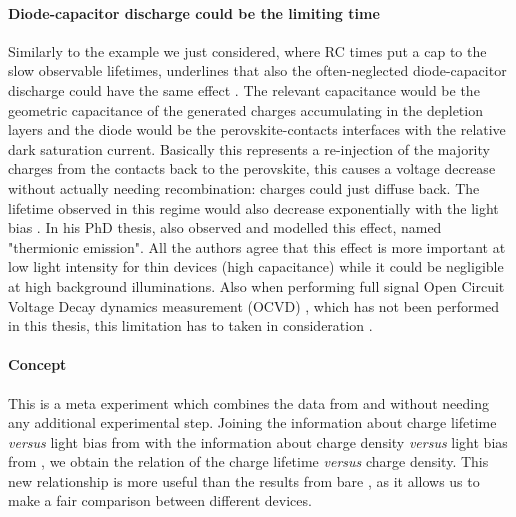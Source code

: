 		\paragraph{Diode\hyp{}capacitor discharge could be the limiting time}
		Similarly to the example we just considered, where RC times put a cap to the slow observable lifetimes,  underlines that also the often-neglected diode\hyp{}capacitor discharge could have the same effect \cite{Tvingstedt2017,Hellen2003}.
		The relevant capacitance would be the geometric capacitance of the generated charges accumulating in the depletion layers and the diode would be the perovskite-contacts interfaces with the relative dark saturation current.
		Basically this represents a re\hyp{}injection of the majority charges from the contacts back to the perovskite, this causes a voltage decrease without actually needing recombination: charges could just diffuse back.
		The lifetime observed in this regime would also decrease exponentially with the light bias \cite{Castaner1981}.
		In his PhD thesis, also  observed and modelled this effect, named "thermionic emission".
		All the authors agree that this effect is more important at low light intensity for thin devices (high capacitance) \cite{Kiermasch2018} while it could be negligible at high background illuminations.
		Also when performing full signal Open Circuit Voltage Decay dynamics measurement (OCVD) \cite{Lederhandler1955,Mahan1981}, which has not been performed in this thesis, this limitation has to taken in consideration \cite{Tvingstedt2017,Pockett2017,Pockett2015,Kiermasch2018}.

		\FloatBarrier
		\newpage
		\label{characterization_tpvce}

		\paragraph{Concept}
		This is a meta experiment which combines the data from  and  without needing any additional experimental step.
		Joining the information about charge lifetime \textsl{versus} light bias from  with the information about charge density \textsl{versus} light bias from , we obtain the relation of the charge lifetime \textsl{versus} charge density.
		This new relationship is more useful than the results from bare , as it allows us to make a fair comparison between different devices.

